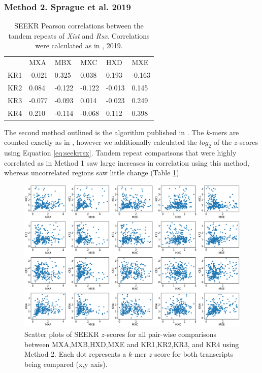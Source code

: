 \subsubsection{Method 2. Sprague et al. 2019}

\begin{table}[h]
\begin{center}
\begin{tabular}{llllll}
&MXA & MBX                  & MXC                  & HXD                  & MXE                                        \\
KR1 & -0.021 & 0.325   & 0.038 & 0.193   & -0.163 \\
KR2 & 0.084  & -0.122  & -0.122 & -0.013 & 0.145  \\
KR3 & -0.077   & -0.093 & 0.014 & -0.023 & 0.249   \\
KR4 & 0.210   & -0.114 & -0.068 & 0.112   & 0.398
\end{tabular}
\caption[Sprague et al. $k$-mer counting]{SEEKR Pearson correlations between the tandem repeats of \emph{Xist} and \emph{Rsx}. Correlations were calculated as in \cite{Sprague2019NonlinearDomains}, 2019.}
\label{tbl:kmers2}

\end{center}
\end{table}

The second method outlined is the algorithm published in \cite{Sprague2019NonlinearDomains}. The $k$-mers are counted exactly as in \cite{Kirk2018FunctionalContent}, however we additionally calculated the $log_2$ of the $z$-scores using Equation \ref{eq:seekrrsx}. Tandem repeat comparisons that were highly correlated as in Method 1 saw large increases in correlation using this method, whereas uncorrelated regions saw little change (Table \ref{tbl:kmers2}). 

\begin{figure}[h]
\centering
\includegraphics[width=.9\textwidth]{images/rsxscatter.pdf}
\caption[Sprague et al. $k$-mer counting $z$-score scatter plots]{Scatter plots of SEEKR $z$-scores for all pair-wise comparisons between MXA,MXB,HXD,MXE and KR1,KR2,KR3, and KR4 using Method 2. Each dot represents a $k$-mer $z$-score for both transcripts being compared (x,y axis).}
\label{fig:rsxscat}
\end{figure}


